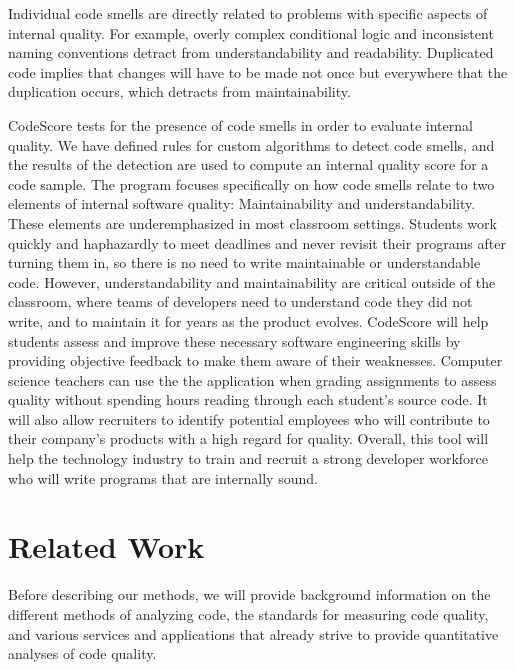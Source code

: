 \documentclass{sig-alternate}
\begin{document}
Individual code smells are directly related to problems with specific aspects of
internal quality. For example, overly complex conditional logic and inconsistent
naming conventions detract from understandability and readability. Duplicated
code implies that changes will have to be made not once but everywhere that the
duplication occurs, which detracts from maintainability. 

CodeScore tests for the presence of code smells in order to evaluate internal
quality. We have defined rules for custom algorithms to detect code smells, and
the results of the detection are used to compute an internal quality score for a
code sample. The program focuses specifically on how code smells relate to two
elements of internal software quality: Maintainability and understandability.
These elements are underemphasized in most classroom settings. Students work
quickly and haphazardly to meet deadlines and never revisit their programs after
turning them in, so there is no need to write maintainable or understandable code.
However, understandability and maintainability are critical outside of the
classroom, where teams of developers need to understand code they did not write,
and to maintain it for years as the product evolves. CodeScore will help
students assess and improve these necessary software engineering skills by
providing objective feedback to make them aware of their weaknesses. Computer
science teachers can use the the application when grading assignments to assess
quality without spending hours reading through each student's source code. It
will also allow recruiters to identify potential employees who will contribute
to their company's products with a high regard for quality. Overall, this tool
will help the technology industry to train and recruit a strong developer
workforce who will write programs that are internally sound. 

\section{Related Work}
\label{sec:related_work}
Before describing our methods, we will provide background information
on the different methods of analyzing code, the standards for measuring code
quality, and various services and applications that already strive to provide
quantitative analyses of code quality.
\end{document}
